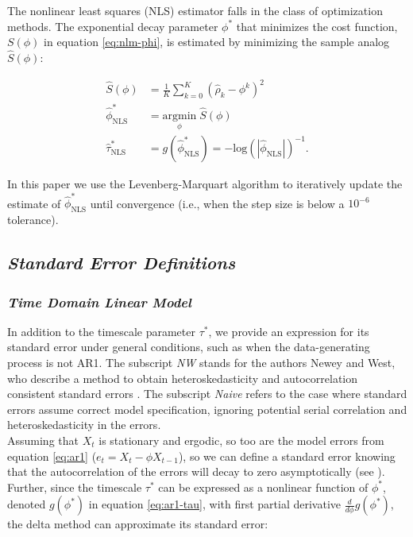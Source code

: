 \documentclass[main.tex]{subfiles}
\begin{document}
The nonlinear least squares (NLS) estimator falls in the class of optimization methods. The exponential decay parameter $\phi^*$ that minimizes the cost function, $S(\phi)$ in equation \eqref{eq:nlm-phi}, is estimated by minimizing the sample analog $\widehat{S}(\phi)$:

\begin{align}
    \widehat{S}(\phi) &= \frac{1}{K} \sum_{k=0}^K (\hat\rho_k - \phi^k)^2\\
    \hat \phi^*_{\scriptscriptstyle\text{NLS}} &= \underset{\phi}{\text{argmin}} \; \widehat{S}(\phi)\\
    \hat \tau^*_{\scriptscriptstyle\text{NLS}} &= g(\hat \phi^*_{\scriptscriptstyle\text{NLS}}) = -{\text{log}(|\hat\phi_{\scriptscriptstyle\text{NLS}}|)}^{-1}.
\end{align}

\noindent In this paper we use the Levenberg-Marquart algorithm to iteratively update the estimate of $\hat \phi^*_{\scriptscriptstyle\text{NLS}}$ until convergence (i.e., when the step size is below a $10^{-6}$ tolerance).\\

\subsection{\textit{Standard Error Definitions}}
\subsubsection{\normalfont\textit{Time Domain Linear Model}}

In addition to the timescale parameter $\tau^*$, we provide an expression for its standard error under general conditions, such as when the data-generating process is not AR1. The subscript \textit{NW} stands for the authors Newey and West, who describe a method to obtain heteroskedasticity and autocorrelation consistent standard errors \citep{newey_simple_1987}. The subscript \textit{Naive} refers to the case where standard errors assume correct model specification, ignoring potential serial correlation and heteroskedasticity in the errors.\\

Assuming that $X_t$ is stationary and ergodic, so too are the model errors from equation \eqref{eq:ar1} ($e_t = X_t - \phi X_{t-1}$), so we can define a standard error knowing that the autocorrelation of the errors will decay to zero asymptotically (see ). Further, since the timescale $\tau^*$ can be expressed as a nonlinear function of $\phi^*$, denoted $g(\phi^*)$ in equation \eqref{eq:ar1-tau}, with first partial derivative $\frac{d}{d\phi} g(\phi^*)$, the delta method can approximate its standard error:
\end{document}
